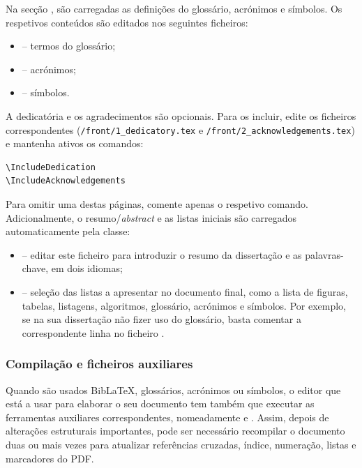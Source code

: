 Na secção , são carregadas as definições do glossário, acrónimos e símbolos. Os respetivos conteúdos são editados nos seguintes ficheiros:
\begin{itemize}
    \item {} -- termos do glossário;
    \item {} -- acrónimos;
    \item {} -- símbolos.
\end{itemize}

A dedicatória e os agradecimentos são opcionais. Para os incluir, edite os ficheiros correspondentes (\verb|/front/1_dedicatory.tex| e \verb|/front/2_acknowledgements.tex|) e mantenha ativos os comandos:
\begin{verbatim}
\IncludeDedication
\IncludeAcknowledgements
\end{verbatim}

Para omitir uma destas páginas, comente apenas o respetivo comando. Adicionalmente, o resumo/\textit{abstract} e as listas iniciais são carregados automaticamente pela classe:
\begin{itemize}
    \item {} -- editar este ficheiro para introduzir o resumo da dissertação e as palavras-chave, em dois idiomas;
    \item {} -- seleção das listas a apresentar no documento final, como a lista de figuras, tabelas, listagens, algoritmos, glossário, acrónimos e símbolos. Por exemplo, se na sua dissertação não fizer uso do glossário, basta comentar a correspondente linha no ficheiro .
\end{itemize}

 
\subsubsection*{Compilação e ficheiros auxiliares}

Quando são usados Bib\LaTeX{}, glossários, acrónimos ou símbolos, o editor que está a usar para elaborar o seu documento tem também que executar as ferramentas auxiliares correspondentes, nomeadamente
 e . Assim, depois de alterações estruturais importantes, pode ser necessário recompilar o documento duas ou mais vezes para atualizar referências cruzadas, índice, numeração, listas e marcadores do PDF. 

